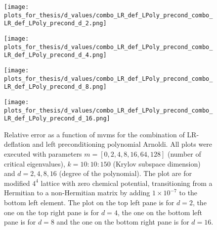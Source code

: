 \begin{figure}[H]
    \centering
    \begin{minipage}{0.45\textwidth}
        \centering
        \texttt{[image: plots\_for\_thesis/d\_values/combo\_LR\_def\_LPoly\_precond\_combo\_LR\_def\_LPoly\_precond\_d\_2.png]} %
    \end{minipage}%
    \hspace{0.02\textwidth} %
    \begin{minipage}{0.45\textwidth}
        \centering
        \texttt{[image: plots\_for\_thesis/d\_values/combo\_LR\_def\_LPoly\_precond\_combo\_LR\_def\_LPoly\_precond\_d\_4.png]} %
    \end{minipage}
    
    \vspace{0.02\textwidth} %
    
    \begin{minipage}{0.45\textwidth}
        \centering
        \texttt{[image: plots\_for\_thesis/d\_values/combo\_LR\_def\_LPoly\_precond\_combo\_LR\_def\_LPoly\_precond\_d\_8.png]} %
    \end{minipage}%
    \hspace{0.02\textwidth} %
    \begin{minipage}{0.45\textwidth}
        \centering
        \texttt{[image: plots\_for\_thesis/d\_values/combo\_LR\_def\_LPoly\_precond\_combo\_LR\_def\_LPoly\_precond\_d\_16.png]} %
    \end{minipage}
    
    \caption{\small Relative error as a function of mvms for the combination of LR-deflation and left preconditioning polynomial Arnoldi. All plots were executed with parameters $m = [0, 2, 4, 8, 16, 64, 128]$ (number of critical eigenvalues), $k = 10:10:150$ (Krylov subspace dimension) and $d = 2, 4, 8, 16$ (degree of the polynomial). The plot are for modified $4^4$ lattice with zero chemical potential, transitioning from a Hermitian to a non-Hermitian matrix by adding $1 \times 10^{-7}$ to the bottom left element. The plot on the top left pane is for $d=2$, the one on the top right pane is for $d=4$, the one on the bottom left pane is for $d=8$ and the one on the bottom right pane is for $d=16$. }
    \label{fig:d_combo_LR+left_pre_cond_mvms_plot}
\end{figure}

